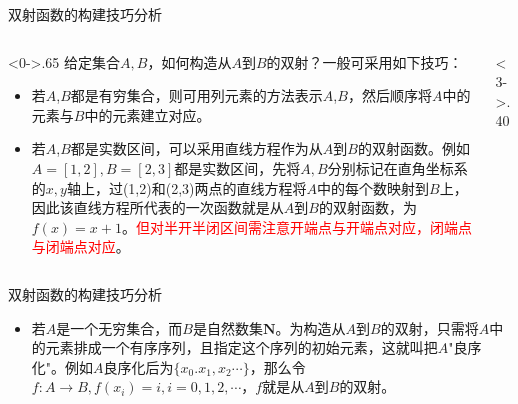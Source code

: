\documentclass[xetex,10pt,aspectratio=43]{beamer}
\begin{document}
\begin{frame}{双射函数的构建技巧分析}
	\begin{columns}[T] %
		\begin{column}<0->{.65\textwidth}
			给定集合$A,B$，如何构造从$A$到$B$的双射？一般可采用如下技巧：
			\begin{itemize}
				\item<2-> 若$A$,$B$都是有穷集合，则可用列元素的方法表示$A$,$B$，然后顺序将$A$中的元素与$B$中的元素建立对应。
				\item<3-> 若$A$,$B$都是实数区间，可以采用直线方程作为从$A$到$B$的双射函数。例如$A=[1,2],B=[2,3]$都是实数区间，先将$A,B$分别标记在直角坐标系的$x,y$轴上，过(1,2)和(2,3)两点的直线方程将$A$中的每个数映射到$B$上，因此该直线方程所代表的一次函数就是从$A$到$B$的双射函数，为$f(x)=x+1$。\textcolor{red}{但对半开半闭区间需注意开端点与开端点对应，闭端点与闭端点对应}。
			\end{itemize}
		\end{column}
		\begin{column}<3->{.40\textwidth}
			\begin{figure}
			\end{figure}
		\end{column}
	\end{columns}
\end{frame}

\begin{frame}{双射函数的构建技巧分析}
	\begin{itemize}
		\item<1-> 若$A$是一个无穷集合，而$B$是自然数集$\mathbf{N}$。为构造从$A$到$B$的双射，只需将$A$中的元素排成一个有序序列，且指定这个序列的初始元素，这就叫把$A$"良序化"。例如$A$良序化后为$\{x_{0}.x_{1},x_{2}\cdots\}$，那么令$f:A\rightarrow B,f(x_{i})=i,i=0,1,2,\cdots$，$f$就是从$A$到$B$的双射。
	\end{itemize}
\end{frame}
\end{document}
